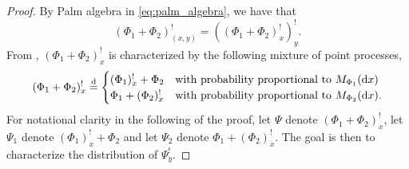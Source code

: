 \documentclass[11pt,a4paper,oneside]{article}
\newcommand{\deq}{\stackrel{\mbox{\scriptsize d}}{=}}
\newcommand{\dd}{\mathrm d}
\theoremstyle{definition}
\theoremstyle{remark}
\begin{document}
\begin{proof}
By Palm algebra in \eqref{eq:palm_algebra}, we have that 
\[(\Phi_1 + \Phi_2)^!_{(x, y)}=((\Phi_1 + \Phi_2)^!_x )_y^{!}.
\]
From , $(\Phi_1 + \Phi_2)^!_x $ is characterized by the following mixture of point processes,
\begin{equation}\label{eq:psi_mixture}
     (\Phi_1 + \Phi_2)^!_{x} \deq \begin{cases}
            (\Phi_1)^!_{ x} + \Phi_2 & \text{with probability proportional to }  M_{\Phi_1}(\dd x) \\
            \Phi_{1} + (\Phi_2)^!_{x} & \text{with probability proportional to } M_{\Phi_2}(\dd x).
        \end{cases}
\end{equation}
For notational clarity in the following of the proof, let $\Psi$ denote $(\Phi_1 + \Phi_2)^!_{x}$, let $\Psi_1$ denote $(\Phi_1)^!_{ x} + \Phi_2$ and let $\Psi_2$ denote $\Phi_{1} + (\Phi_2)^!_{x}$. The goal is then to characterize the distribution of $\Psi^!_y$. 


\end{proof}
\end{document}
